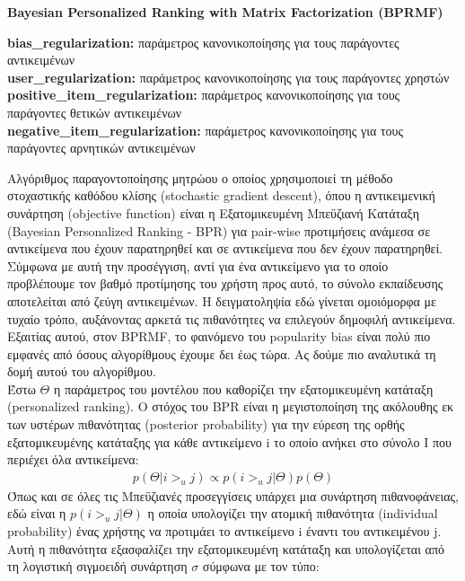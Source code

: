 \noindent \textbf{Bayesian Personalized Ranking with Matrix Factorization (BPRMF)} \cite{rendleBPRBayesianPersonalized2009}
\begin{tcolorbox}[
	colframe=blue!25,
	colback=blue!10,
	coltitle=blue!20!black,  
	fonttitle=\bfseries,
	adjusted title= Υπερπαράμετροι]	
	
	\textbf{bias\_regularization:} παράμετρος κανονικοποίησης για τους παράγοντες αντικειμένων \\ 
	\textbf{user\_regularization:} παράμετρος κανονικοποίησης για τους παράγοντες χρηστών\\
	\textbf{positive\_item\_regularization:} παράμετρος κανονικοποίησης για τους παράγοντες θετικών αντικειμένων\\
	\textbf{negative\_item\_regularization:} παράμετρος κανονικοποίησης για τους παράγοντες αρνητικών αντικειμένων
\end{tcolorbox}
\noindent Αλγόριθμος παραγοντοποίησης μητρώου ο οποίος χρησιμοποιεί τη μέθοδο στοχαστικής καθόδου κλίσης (stochastic gradient descent), όπου η αντικειμενική συνάρτηση (objective function) είναι η Εξατομικευμένη Μπεϋζιανή Κατάταξη (Bayesian Personalized Ranking - BPR) για pair-wise προτιμήσεις ανάμεσα σε αντικείμενα που έχουν παρατηρηθεί και σε αντικείμενα που δεν έχουν παρατηρηθεί. Σύμφωνα με αυτή την προσέγγιση, αντί για ένα αντικείμενο για το οποίο προβλέπουμε τον βαθμό προτίμησης του χρήστη προς αυτό, το σύνολο εκπαίδευσης αποτελείται από ζεύγη αντικειμένων. Η δειγματοληψία εδώ γίνεται ομοιόμορφα με τυχαίο τρόπο, αυξάνοντας αρκετά τις πιθανότητες να επιλεγούν δημοφιλή αντικείμενα. Εξαιτίας αυτού, στον BPRMF, το φαινόμενο του popularity bias είναι πολύ πιο εμφανές από όσους αλγορίθμους έχουμε δει έως τώρα. Ας δούμε πιο αναλυτικά τη δομή αυτού του αλγορίθμου.\\
Έστω $ \Theta $ η παράμετρος του μοντέλου που καθορίζει την εξατομικευμένη κατάταξη (personalized ranking). Ο στόχος του BPR είναι η μεγιστοποίηση της ακόλουθης εκ των υστέρων πιθανότητας (posterior probability) για την εύρεση της ορθής εξατομικευμένης κατάταξης για κάθε αντικείμενο i το οποίο ανήκει στο σύνολο I που περιέχει όλα αντικείμενα:
\begin{align}
	p(\Theta | i >_u j ) \propto p( i >_u j |\Theta) p(\Theta)
\end{align} 
Όπως και σε όλες τις Μπεϋζιανές προσεγγίσεις υπάρχει μια συνάρτηση πιθανοφάνειας, εδώ είναι η $  p( i >_u j |\Theta) $ η οποία υπολογίζει την ατομική πιθανότητα (individual probability) ένας χρήστης να προτιμάει το αντικείμενο i έναντι του αντικειμένου j. Αυτή η πιθανότητα εξασφαλίζει την εξατομικευμένη κατάταξη και υπολογίζεται από τη λογιστική σιγμοειδή συνάρτηση $ \sigma $ σύμφωνα με τον τύπο:
